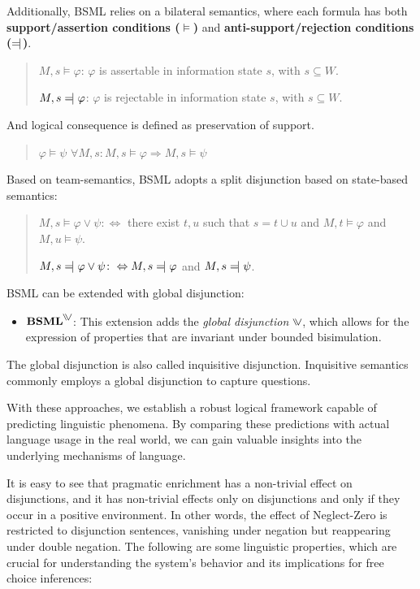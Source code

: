Additionally, BSML relies on a bilateral semantics, where each formula has both \textbf{support/assertion conditions ($\models$)} and \textbf{anti-support/rejection conditions ($\leftmodels$)}.

\begin{quote}
    $M, s \models \varphi$: \( \varphi \) is assertable in information state \( s \), with \( s \subseteq W \).

    $M, s \leftmodels \varphi$: $\varphi$ is rejectable in information state $s$, with $s \subseteq W$.
\end{quote}

And logical consequence is defined as preservation of support. 

\begin{quote}
\(\varphi \models \psi\) \quad {} \quad $\forall M, s : M, s \models \varphi \Rightarrow M, s \models \psi$
\end{quote}

Based on team-semantics, BSML adopts a split disjunction based on state-based semantics:

\begin{quote}
    $M, s \models \varphi \vee \psi \colon \Leftrightarrow$ there exist $t, u$ such that $s = t \cup u$ and $M, t \models \varphi$ and $M, u \models \psi$.
    
    $M, s \leftmodels \varphi \vee \psi \colon \Leftrightarrow M, s \leftmodels \varphi$ and $M, s \leftmodels \psi$.
\end{quote}


BSML can be extended with global disjunction:
\begin{itemize}
    \item \(\textbf{BSML}^{\inqdisj}\): This extension adds the \textit{global disjunction} \(\inqdisj\), which allows for the expression of properties that are invariant under bounded bisimulation.
\end{itemize}

The global disjunction is also called inquisitive disjunction. 
Inquisitive semantics commonly employs a global disjunction to capture questions. 


With these approaches, we establish a robust logical framework capable of predicting linguistic phenomena. 
By comparing these predictions with actual language usage in the real world, we can gain valuable insights into the underlying mechanisms of language.


It is easy to see that pragmatic enrichment has a non-trivial effect on disjunctions, 
and it has non-trivial effects only on disjunctions and only if they occur in a positive environment. 
In other words, the effect of Neglect-Zero is restricted to disjunction sentences, vanishing under negation but reappearing under double negation.
The following are some linguistic properties, which are crucial for understanding the system's behavior and its implications for free choice inferences:

